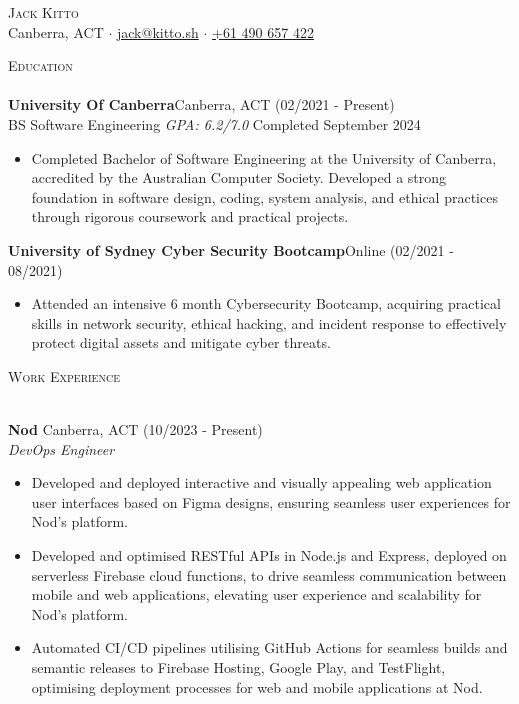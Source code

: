 \documentclass[a4paper]{article}
\newcommand{\lineunder} {
    \vspace*{-8pt} \\
    \hspace*{-18pt} \hrulefill \\
}
\newcommand{\header} [1] {
    {\hspace*{-18pt}\vspace*{6pt} \textsc{#1}}
    \vspace*{-6pt} \lineunder
}
\begin{document}
    \vspace*{-40pt}

\vspace*{-10pt}
\begin{center}
  {\Huge \scshape {Jack Kitto}}\\
  Canberra, ACT $\cdot$ \href{mailto:jack@kitto.sh}{jack@kitto.sh} $\cdot$ \href{tel:+61 490 657 422}{+61 490 657 422} \\
\end{center}

      \header{Education}
      \textbf{University Of Canberra}\hfill Canberra, ACT (02/2021 - Present)\\
BS Software Engineering \textit{GPA: 6.2/7.0} \hfill Completed September 2024\\
\begin{itemize} \itemsep 1pt
  \item Completed Bachelor of Software Engineering at the University of Canberra, accredited by the Australian Computer Society. Developed a strong foundation in software design, coding, system analysis, and ethical practices through rigorous coursework and practical projects.
\end{itemize}
      \textbf{University of Sydney Cyber Security Bootcamp}\hfill Online (02/2021 - 08/2021)\\
\begin{itemize} \itemsep 1pt
  \item Attended an intensive 6 month Cybersecurity Bootcamp, acquiring practical skills in network security, ethical hacking, and incident response to effectively protect digital assets and mitigate cyber threats.
\end{itemize}
      \header{Work Experience}
      \vspace{1mm}

      \textbf{Nod} \hfill Canberra, ACT (10/2023 - Present)\\
          \textit{DevOps Engineer} 
\begin{itemize} \itemsep 1pt
      \item Developed and deployed interactive and visually appealing web application user interfaces based on Figma designs, ensuring seamless user experiences for Nod's platform.
      \item Developed and optimised RESTful APIs in Node.js and Express, deployed on serverless Firebase cloud functions, to drive seamless communication between mobile and web applications, elevating user experience and scalability for Nod's platform.
      \item Automated CI/CD pipelines utilising GitHub Actions for seamless builds and semantic releases to Firebase Hosting, Google Play, and TestFlight, optimising deployment processes for web and mobile applications at Nod.
\end{itemize}
\end{document}
